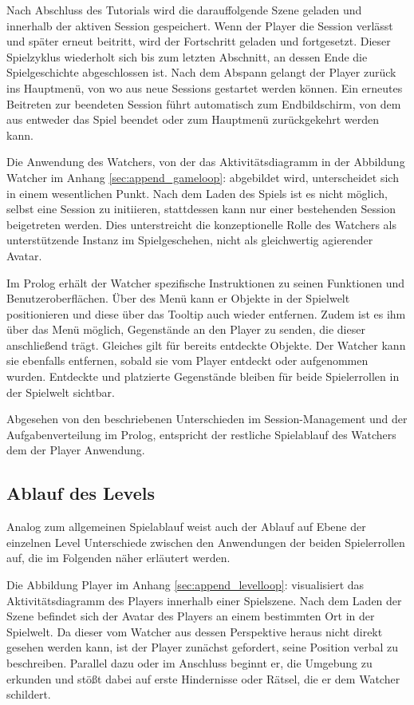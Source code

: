Nach Abschluss des Tutorials wird die darauffolgende Szene geladen und innerhalb der aktiven Session gespeichert. Wenn der Player die Session verlässt und später erneut beitritt, wird der Fortschritt geladen und fortgesetzt. Dieser Spielzyklus wiederholt sich bis zum letzten Abschnitt, an dessen Ende die Spielgeschichte abgeschlossen ist. Nach dem Abspann gelangt der Player zurück ins Hauptmenü, von wo aus neue Sessions gestartet werden können. Ein erneutes Beitreten zur beendeten Session führt automatisch zum Endbildschirm, von dem aus entweder das Spiel beendet oder zum Hauptmenü zurückgekehrt werden kann.

Die Anwendung des Watchers, von der das Aktivitätsdiagramm in der Abbildung Watcher im Anhang \ref{sec:append_gameloop}:  abgebildet wird, unterscheidet sich in einem wesentlichen Punkt. Nach dem Laden des Spiels ist es nicht möglich, selbst eine Session zu initiieren, stattdessen kann nur einer bestehenden Session beigetreten werden. Dies unterstreicht die konzeptionelle Rolle des Watchers als unterstützende Instanz im Spielgeschehen, nicht als gleichwertig agierender Avatar.

Im Prolog erhält der Watcher spezifische Instruktionen zu seinen Funktionen und Benutzeroberflächen. Über des Menü  kann er Objekte in der Spielwelt positionieren und diese über das Tooltip auch wieder entfernen. Zudem ist es ihm über das Menü  möglich, Gegenstände an den Player zu senden, die dieser anschließend trägt. Gleiches gilt für bereits entdeckte Objekte. Der Watcher kann sie ebenfalls entfernen, sobald sie vom Player entdeckt oder aufgenommen wurden. Entdeckte und platzierte Gegenstände bleiben für beide Spielerrollen in der Spielwelt sichtbar.

Abgesehen von den beschriebenen Unterschieden im Session-Management und der Aufgabenverteilung im Prolog, entspricht der restliche Spielablauf des Watchers dem der Player Anwendung.

\subsection{Ablauf des Levels}

Analog zum allgemeinen Spielablauf weist auch der Ablauf auf Ebene der einzelnen Level Unterschiede zwischen den Anwendungen der beiden Spielerrollen auf, die im Folgenden näher erläutert werden. 

Die Abbildung Player im Anhang \ref{sec:append_levelloop}:  visualisiert das Aktivitätsdiagramm des Players innerhalb einer Spielszene. Nach dem Laden der Szene befindet sich der Avatar des Players an einem bestimmten Ort in der Spielwelt. Da dieser vom Watcher aus dessen Perspektive heraus nicht direkt gesehen werden kann, ist der Player zunächst gefordert, seine Position verbal zu beschreiben. Parallel dazu oder im Anschluss beginnt er, die Umgebung zu erkunden und stößt dabei auf erste Hindernisse oder Rätsel, die er dem Watcher schildert. 

